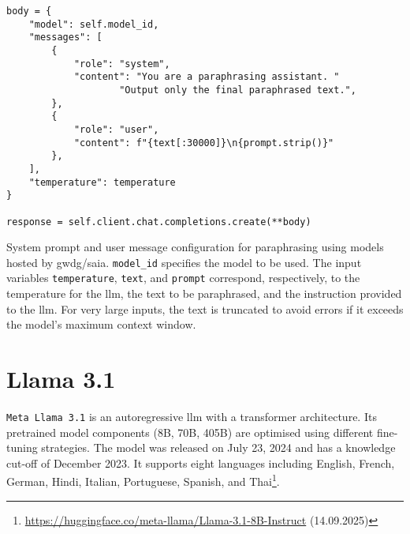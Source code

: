 \begin{listing}[H]
\centering
\begin{verbatim}
body = {
    "model": self.model_id,
    "messages": [
        {
            "role": "system",
            "content": "You are a paraphrasing assistant. "
                    "Output only the final paraphrased text.",
        },
        {
            "role": "user",
            "content": f"{text[:30000]}\n{prompt.strip()}"
        },
    ],
    "temperature": temperature
}

response = self.client.chat.completions.create(**body)
\end{verbatim}
\caption{
System prompt and user message configuration for paraphrasing using models hosted by \ac{gwdg}/\ac{saia}. 
\texttt{model\_id} specifies the model to be used. 
The input variables \texttt{temperature}, \texttt{text}, and \texttt{prompt} correspond, respectively, to the temperature for the \ac{llm}, the text to be paraphrased, and the instruction provided to the \ac{llm}.
For very large inputs, the text is truncated to avoid errors if it exceeds the model’s maximum context window.
}
\label{lst:paraphrase_prompt}
\end{listing}



\section{Llama 3.1}

\texttt{Meta Llama 3.1} is an autoregressive \ac{llm} with a transformer architecture.
Its pretrained model components  (8B, 70B, 405B) are optimised using different fine-tuning strategies.
The model was released on July 23, 2024 and has a knowledge cut-off of December 2023.
It supports eight languages including English, French, German, Hindi, Italian, Portuguese, Spanish, and Thai\footnote{\url{https://huggingface.co/meta-llama/Llama-3.1-8B-Instruct} (14.09.2025)}.



